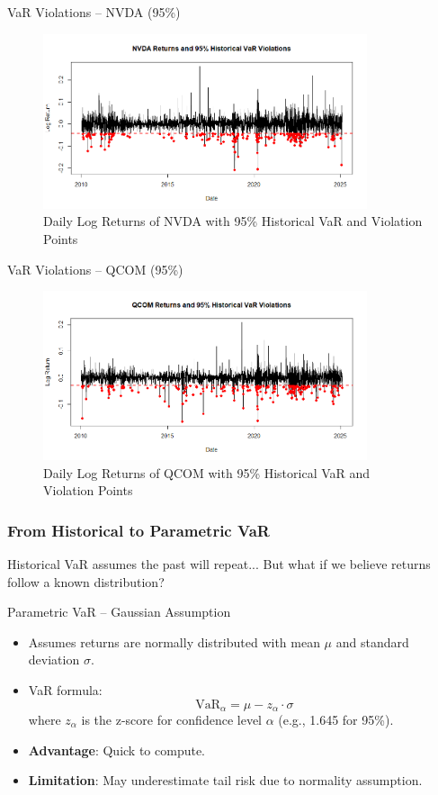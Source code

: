 \documentclass{beamer}[9pt]
\begin{document}
\begin{frame}{VaR Violations – NVDA (95\%)}
	\begin{figure}[!h]
		\centering
		\includegraphics[width=0.85\textwidth]{plots/nvda_hist_var_marked.png}
		\caption{Daily Log Returns of NVDA with 95\% Historical VaR and Violation Points}
	\end{figure}
\end{frame}

\begin{frame}{VaR Violations – QCOM (95\%)}
	\begin{figure}[!h]
		\centering
		\includegraphics[width=0.85\textwidth]{plots/qcom_hist_var_marked.png}
		\caption{Daily Log Returns of QCOM with 95\% Historical VaR and Violation Points}
	\end{figure}
\end{frame}

\begin{frame}
	\frametitle{From Historical to Parametric VaR}
	\centering
	\Large
	Historical VaR assumes the past will repeat...  
	But what if we believe returns follow a known distribution?
\end{frame}

\begin{frame}{Parametric VaR – Gaussian Assumption}
	\begin{itemize}
		\item Assumes returns are normally distributed with mean $\mu$ and standard deviation $\sigma$.
		\item VaR formula:
		\[
		\text{VaR}_\alpha = \mu - z_\alpha \cdot \sigma
		\]
		where $z_\alpha$ is the z-score for confidence level $\alpha$ (e.g., 1.645 for 95\%).
		\item \textbf{Advantage}: Quick to compute.
		\item \textbf{Limitation}: May underestimate tail risk due to normality assumption.
	\end{itemize}
\end{frame}
\end{document}

